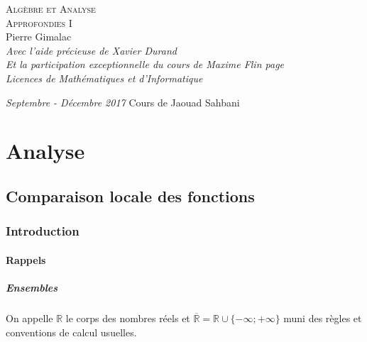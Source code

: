 \documentclass[a4paper,10pt]{book} %
\newcommand{\R}{\mathbb{R}}
\newcommand{\Rb}{\overline{\mathbb{R}}}
\begin{document}
\begin{titlepage}
\thispagestyle{empty}
\begin{center}
\vspace*{6.7cm}
\Huge \textsc{Algèbre et Analyse\\ Approfondies I}\\
\vspace{1.5cm}
\Large Pierre Gimalac\\
\vspace{0.2cm}
\normalsize\textit{Avec l'aide précieuse de Xavier Durand}\\
\small \textit{Et la participation exceptionnelle du cours de Maxime Flin page \pageref{maxime}}\\
\vspace{0.5cm}
\large \textit{Licences de Mathématiques et d'Informatique}
\vfill
\end{center}
\large \textit{Septembre - Décembre 2017}
\hfill
\large Cours de Jaouad Sahbani
\restoregeometry
\end{titlepage}

\renewcommand{\contentsname}{Sommaire}
\thispagestyle{empty}
\tableofcontents
\thispagestyle{empty}

\part{Analyse}


\chapter{Comparaison locale des fonctions}
\section{Introduction}
\subsection{Rappels}
\subsubsection{Ensembles}
On appelle $\R$ le corps des nombres réels et $\Rb=\R \cup \{-\infty ; + \infty \}$ muni des règles et conventions de calcul usuelles.
\end{document}
